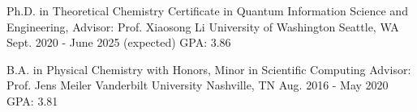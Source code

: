 


\begin{cventries}


\cventry
{Ph.D. in Theoretical Chemistry \newline
Certificate in Quantum Information Science and Engineering, \newline
Advisor: Prof. Xiaosong Li} %
{University of Washington} %
{Seattle, WA\vspace{-0.5cm}} %
{Sept. 2020 - June 2025 (expected)} %
{GPA: 3.86} %



\cventry
{B.A. in Physical Chemistry with Honors, Minor in Scientific Computing \newline
Advisor: Prof. Jens Meiler}%
{Vanderbilt University} %
{Nashville, TN} %
{Aug. 2016 - May 2020} %
{GPA: 3.81} %


\end{cventries}
